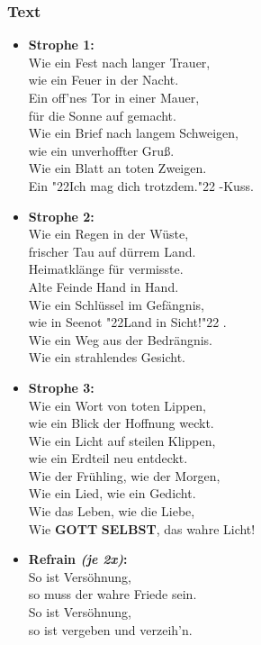 \documentclass[12pt,a5paper]{article}
\newcommand{\Gott}[0]{\textbf{GOTT}}
\newcommand{\Selbst}[0]{\textbf{SELBST}}
\newcommand{\q}[1]{\char"22{#1}\char"22 }
\begin{document}
		\subsubsection{Text}
			\begin{itemize}
				\item	\textbf{Strophe 1:}
				\\		Wie ein Fest nach langer Trauer,
				\\		wie ein Feuer in der Nacht.
				\\		Ein off'nes Tor in einer Mauer,
				\\		f\"ur die Sonne auf gemacht.
				\\		Wie ein Brief nach langem Schweigen,
				\\		wie ein unverhoffter Gru{\ss}.
				\\		Wie ein Blatt an toten Zweigen.
				\\		Ein \q{Ich mag dich trotzdem.}-Kuss.
				\item	\textbf{Strophe 2:}
				\\		Wie ein Regen in der W\"uste,
				\\		frischer Tau auf d\"urrem Land.
				\\		Heimatkl\"ange für vermisste.
				\\		Alte Feinde Hand in Hand.
				\\		Wie ein Schl\"ussel im Gef\"angnis,
				\\		wie in Seenot \q{Land in Sicht!}.
				\\		Wie ein Weg aus der Bedr\"angnis.
				\\		Wie ein strahlendes Gesicht.
				\item	\textbf{Strophe 3:}
				\\		Wie ein Wort von toten Lippen,
				\\		wie ein Blick der Hoffnung weckt.
				\\		Wie ein Licht auf steilen Klippen,
				\\		wie ein Erdteil neu entdeckt.
				\\		Wie der Fr\"uhling,
						wie der Morgen,
				\\		Wie ein Lied,
						wie ein Gedicht.
				\\		Wie das Leben,
						wie die Liebe,
				\\		Wie {\Gott} {\Selbst},
						das wahre Licht!
				\item	\textbf{Refrain \textit{(je 2x)}:}
				\\		So ist Vers\"ohnung,
				\\		so muss der wahre Friede sein.
				\\		So ist Vers\"ohnung,
				\\		so ist vergeben und verzeih'n.
			\end{itemize}
		
\end{document}
